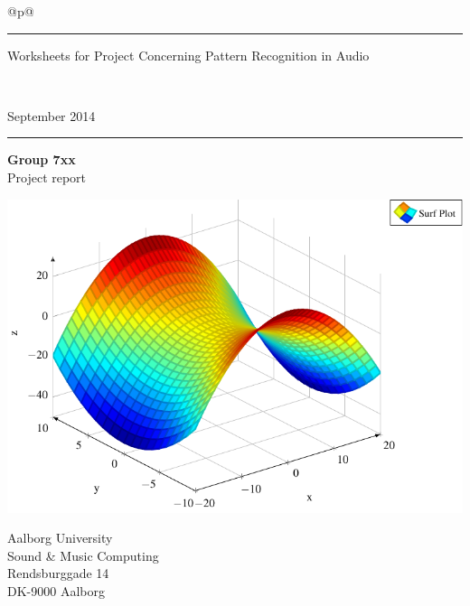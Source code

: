 \thispagestyle{empty}
\noindent%
\begin{tabular}{@{}p{\textwidth}@{}}
    \rule{\linewidth}{2mm}\vspace{1.5cm}
    \vspace*{-15mm}
    \begin{flushleft}
        \linespread{0.7}
        \fontsize{50}{60}\selectfont\fatfont
        Worksheets for
        Project Concerning
        Pattern Recognition in Audio
    \end{flushleft} \\[5mm] 
    \raggedright{
        \fontsize{30}{40}\selectfont\sffamily
        September 2014\\ \vspace*{1mm}
    }
    \rule{\linewidth}{.7mm}
\end{tabular}
\begin{flushleft}
  {\Huge\sffamily\bfseries
    Group 7xx%
  }\\
  \vspace{0.2cm}
  {\LARGE\sffamily
    Project report%
  }
\end{flushleft}
\begin{center}
    \includegraphics[scale=.7]{img/frontpage}
\end{center}
\vfill
\begin{flushleft}\sffamily\large
  Aalborg University\\
  Sound \& Music Computing\\
  Rendsburggade 14\\
  DK-9000 Aalborg
\end{flushleft}

